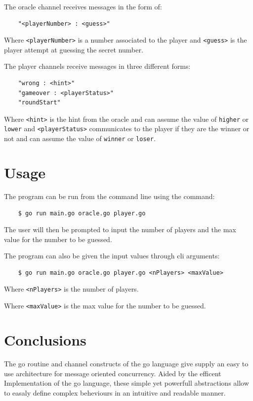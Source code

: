 \documentclass[12pt, a4paper]{report}
\begin{document}
The oracle channel receives messages in the form of:
\begin{lstlisting}
    "<playerNumber> : <guess>"
\end{lstlisting}
Where \verb|<playerNumber>| is a number associated to the player and \verb|<guess>| is the player attempt at guessing the secret number.

The player channels receive messages in three different forms:
\begin{lstlisting}
    "wrong : <hint>"
    "gameover : <playerStatus>"
    "roundStart"
\end{lstlisting}
Where \verb|<hint>| is the hint from the oracle and can assume the value of \verb|higher| or \verb|lower| 
 and \verb|<playerStatus>| communicates to the player if they are the winner or not and can assume the value of \verb|winner| or \verb|loser|.

\chapter{Usage}
The program can be run from the command line using the command:
\begin{lstlisting}
    $ go run main.go oracle.go player.go
\end{lstlisting}
The user will then be prompted to input the number of players and the max value for the number to be guessed.

The program can also be given the input values through cli arguments:
\begin{lstlisting}
    $ go run main.go oracle.go player.go <nPlayers> <maxValue>
\end{lstlisting}
Where \verb|<nPlayers>| is the number of players.

Where \verb|<maxValue>| is the max value for the number to be guessed.

\chapter{Conclusions}
The go routine and channel constructs of the go language give supply an easy to use architecture for message oriented concurrency. Aided by the efficent Implementation
 of the go language, these simple yet powerfull abstractions allow to easaly define complex beheviours in an intuitive and readable manner.



\end{document}
